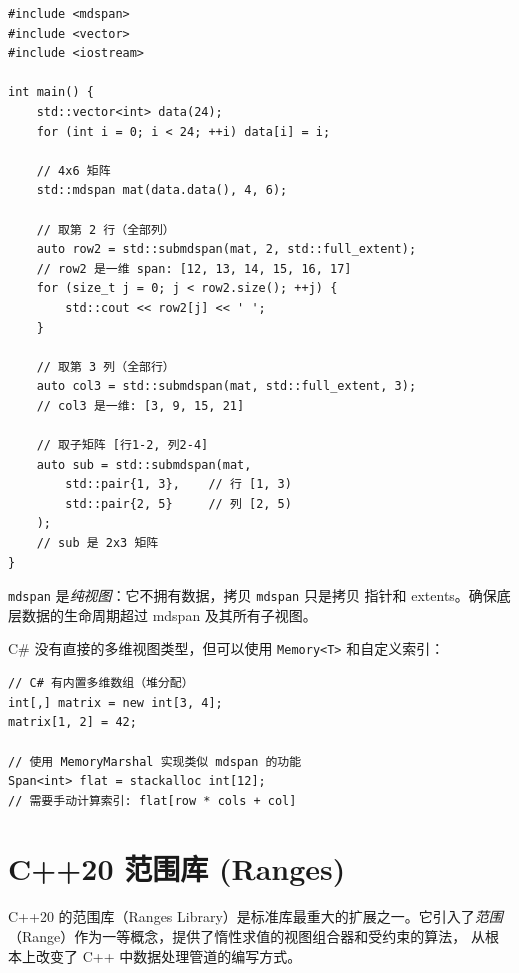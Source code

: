 \documentclass[12pt,a4paper,fontset=fandol]{ctexbook}
\begin{document}
\begin{lstlisting}
#include <mdspan>
#include <vector>
#include <iostream>

int main() {
    std::vector<int> data(24);
    for (int i = 0; i < 24; ++i) data[i] = i;

    // 4x6 矩阵
    std::mdspan mat(data.data(), 4, 6);

    // 取第 2 行（全部列）
    auto row2 = std::submdspan(mat, 2, std::full_extent);
    // row2 是一维 span: [12, 13, 14, 15, 16, 17]
    for (size_t j = 0; j < row2.size(); ++j) {
        std::cout << row2[j] << ' ';
    }

    // 取第 3 列（全部行）
    auto col3 = std::submdspan(mat, std::full_extent, 3);
    // col3 是一维: [3, 9, 15, 21]

    // 取子矩阵 [行1-2, 列2-4]
    auto sub = std::submdspan(mat,
        std::pair{1, 3},    // 行 [1, 3)
        std::pair{2, 5}     // 列 [2, 5)
    );
    // sub 是 2x3 矩阵
}
\end{lstlisting}

\begin{note}
\texttt{mdspan} 是\emph{纯视图}：它不拥有数据，拷贝 \texttt{mdspan} 只是拷贝
指针和 extents。确保底层数据的生命周期超过 mdspan 及其所有子视图。
\end{note}

\begin{compare}
C\# 没有直接的多维视图类型，但可以使用 \texttt{Memory<T>} 和自定义索引：
\begin{lstlisting}[style=csharpstyle]
// C# 有内置多维数组（堆分配）
int[,] matrix = new int[3, 4];
matrix[1, 2] = 42;

// 使用 MemoryMarshal 实现类似 mdspan 的功能
Span<int> flat = stackalloc int[12];
// 需要手动计算索引: flat[row * cols + col]
\end{lstlisting}
\end{compare}

\part{C++20 范围库 (Ranges)}

C++20 的范围库（Ranges Library）是标准库最重大的扩展之一。它引入了\emph{范围}
（Range）作为一等概念，提供了惰性求值的视图组合器和受约束的算法，
从根本上改变了 C++ 中数据处理管道的编写方式。
\end{document}
